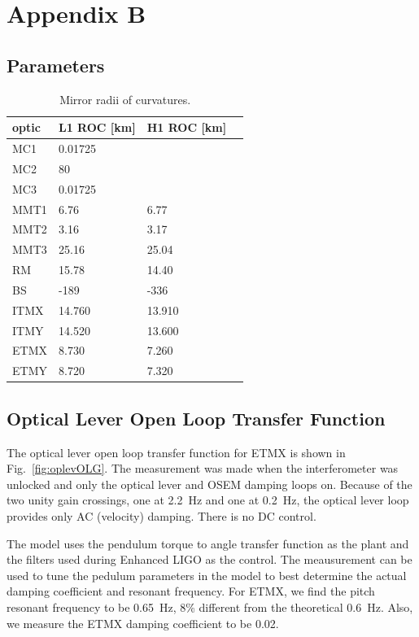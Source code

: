 \chapter{Appendix B}



\section{Parameters}
\begin{table}
\centering
\caption{Mirror radii of curvatures.} 
\begin{tabular}{l l l l}
\hline
optic & L1 ROC [km] & H1 ROC [km] \\
\hline
MC1 & 0.01725 & \\
MC2 & 80 & \\ 
MC3 & 0.01725 & \\ 
MMT1 & 6.76 & 6.77 \\
MMT2 & 3.16 & 3.17 \\
MMT3 & 25.16 & 25.04\\
RM & 15.78 & 14.40 \\
BS & -189 & -336 \\
ITMX & 14.760 & 13.910 \\ 
ITMY & 14.520 & 13.600 \\
ETMX & 8.730 & 7.260 \\
ETMY & 8.720 & 7.320 \\
\hline
\end{tabular}
\label{tab:ROCs}
\end{table} 



\section{Optical Lever Open Loop Transfer Function}
The optical lever open loop transfer function for ETMX is shown in
Fig.~\ref{fig:oplevOLG}. The measurement was made when the
interferometer was unlocked and only the optical lever and OSEM
damping loops on. Because of the two unity gain crossings, one at
2.2~Hz and one at 0.2~Hz, the optical lever loop provides only AC
(velocity) damping. There is no DC control. 

The model uses the pendulum torque to angle transfer function as the
plant and the filters used during Enhanced LIGO as the control. The
meausurement can be used to tune the pedulum parameters in the model
to best determine the actual damping coefficient and resonant
frequency. For ETMX, we find the pitch resonant frequency to be
0.65~Hz, 8\% different from the theoretical 0.6~Hz. Also, we measure
the ETMX damping coefficient to be 0.02. 

